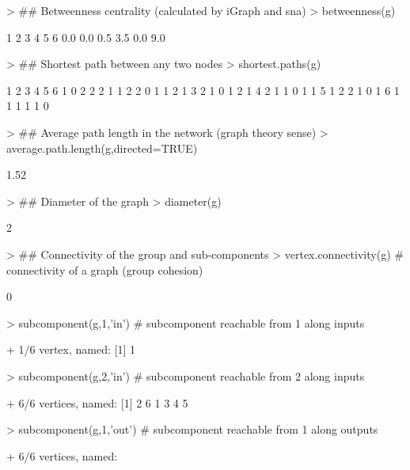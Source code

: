 \documentclass[article]{jss}
\begin{document}
\begin{Schunk}
\begin{Sinput}
> ## Betweenness centrality (calculated by iGraph and sna)
> betweenness(g)
\end{Sinput}
\begin{Soutput}
  1   2   3   4   5   6 
0.0 0.0 0.5 3.5 0.0 9.0 
\end{Soutput}
\begin{Sinput}
> ## Shortest path between any two nodes
> shortest.paths(g)
\end{Sinput}
\begin{Soutput}
  1 2 3 4 5 6
1 0 2 2 2 1 1
2 2 0 1 1 2 1
3 2 1 0 1 2 1
4 2 1 1 0 1 1
5 1 2 2 1 0 1
6 1 1 1 1 1 0
\end{Soutput}
\begin{Sinput}
> ## Average path length in the network (graph theory sense)
> average.path.length(g,directed=TRUE)
\end{Sinput}
\begin{Soutput}
[1] 1.52
\end{Soutput}
\begin{Sinput}
> ## Diameter of the graph
> diameter(g)
\end{Sinput}
\begin{Soutput}
[1] 2
\end{Soutput}
\begin{Sinput}
> ## Connectivity of the group and sub-components
> vertex.connectivity(g)  # connectivity of a graph (group cohesion)
\end{Sinput}
\begin{Soutput}
[1] 0
\end{Soutput}
\begin{Sinput}
> subcomponent(g,1,'in')  # subcomponent reachable from 1 along inputs
\end{Sinput}
\begin{Soutput}
+ 1/6 vertex, named:
[1] 1
\end{Soutput}
\begin{Sinput}
> subcomponent(g,2,'in')  # subcomponent reachable from 2 along inputs
\end{Sinput}
\begin{Soutput}
+ 6/6 vertices, named:
[1] 2 6 1 3 4 5
\end{Soutput}
\begin{Sinput}
> subcomponent(g,1,'out') # subcomponent reachable from 1 along outputs
\end{Sinput}
\begin{Soutput}
+ 6/6 vertices, named:

\end{Soutput}
\end{Schunk}
\end{document}
